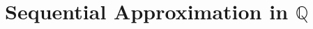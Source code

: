 \section{\texorpdfstring{Sequential Approximation in $\mathbb{Q}$}{Sequential Approximation in Q}}
\label{sec:sequential-approximation-q}


